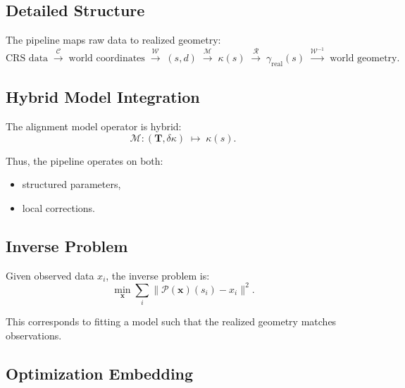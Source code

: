 \subsection{Detailed Structure}

The pipeline maps raw data to realized geometry:
\[
\text{CRS data}
\;\xrightarrow{\mathcal{C}}\;
\text{world coordinates}
\;\xrightarrow{\mathcal{W}}\;
(s,d)
\;\xrightarrow{\mathcal{M}}\;
\kappa(s)
\;\xrightarrow{\mathcal{R}}\;
\gamma_{\mathrm{real}}(s)
\;\xrightarrow{\mathcal{W}^{-1}}\;
\text{world geometry}.
\]


\subsection{Hybrid Model Integration}

The alignment model operator is hybrid:
\[
\mathcal{M}
:
(\mathbf{T}, \delta\kappa)
\;\mapsto\;
\kappa(s).
\]

Thus, the pipeline operates on both:
\begin{itemize}
\item structured parameters,
\item local corrections.
\end{itemize}


\subsection{Inverse Problem}

\begin{definition}
Given observed data \(x_i\), the inverse problem is:
\[
\min_{\mathbf{x}}
\sum_i
\|
\mathcal{P}(\mathbf{x})(s_i) - x_i
\|^2.
\]
\end{definition}

This corresponds to fitting a model such that the realized geometry
matches observations.


\subsection{Optimization Embedding}

